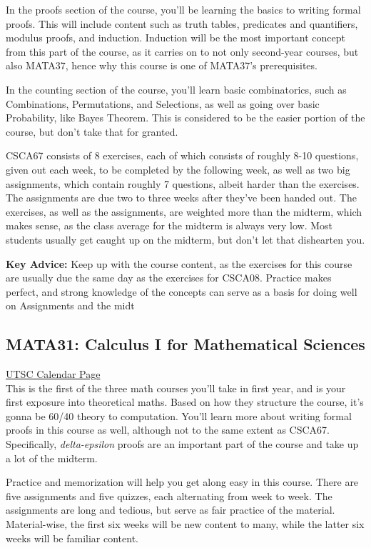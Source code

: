 \documentclass[11pt]{article}
\begin{document}
In the proofs section of the course, you'll be learning the basics to
writing formal proofs. This will include content such as truth tables,
predicates and quantifiers, modulus proofs, and induction. Induction
will be the most important concept from this part of the course, as it
carries on to not only second-year courses, but also MATA37, hence why
this course is one of MATA37's prerequisites.

In the counting section of the course, you'll learn basic combinatorics,
such as Combinations, Permutations, and Selections, as well as going
over basic Probability, like Bayes Theorem. This is considered to be the
easier portion of the course, but don't take that for granted.

CSCA67 consists of 8 exercises, each of which consists of roughly 8-10
questions, given out each week, to be completed by the following week,
as well as two big assignments, which contain roughly 7 questions,
albeit harder than the exercises. The assignments are due two to three
weeks after they've been handed out. The exercises, as well as the
assignments, are weighted more than the midterm, which makes sense, as
the class average for the midterm is always very low. Most students
usually get caught up on the midterm, but don't let that dishearten you.

\textbf{Key Advice:} 
Keep up with the course content, as the exercises for this course are
usually due the same day as the exercises for CSCA08. Practice makes
perfect, and strong knowledge of the concepts can serve as a basis for
doing well on Assignments and the midt


\subsection{MATA31: Calculus I for Mathematical Sciences}

\href{https://utsc.calendar.utoronto.ca/course/MATA31H3}{UTSC Calendar Page}\\

This is the first of the three math courses you'll take in first year,
and is your first exposure into theoretical maths. Based on how they
structure the course, it's gonna be 60/40 theory to computation. You'll
learn more about writing formal proofs in this course as well, although
not to the same extent as CSCA67. Specifically, \textit{delta-epsilon}
proofs are an important part of the course and take up a lot of the
midterm.

Practice and memorization will help you get along easy in this course.
There are five assignments and five quizzes, each alternating from
week to week. The assignments are long and tedious, but serve as fair
practice of the material. Material-wise, the first six weeks will be new
content to many, while the latter six weeks will be familiar content.
\end{document}
